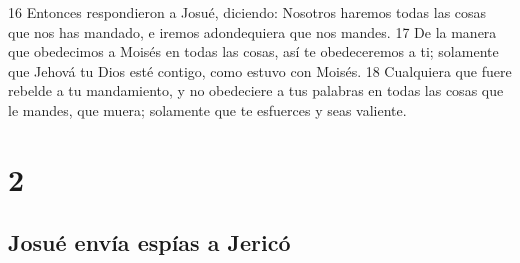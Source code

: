 16 Entonces respondieron a Josué, diciendo: Nosotros haremos todas las cosas que nos has mandado, e iremos adondequiera que nos mandes.
17 De la manera que obedecimos a Moisés en todas las cosas, así te obedeceremos a ti; solamente que Jehová tu Dios esté contigo, como estuvo con Moisés.
18 Cualquiera que fuere rebelde a tu mandamiento, y no obedeciere a tus palabras en todas las cosas que le mandes, que muera; solamente que te esfuerces y seas valiente.

\chapter{2}

\section*{Josué envía espías a Jericó}

